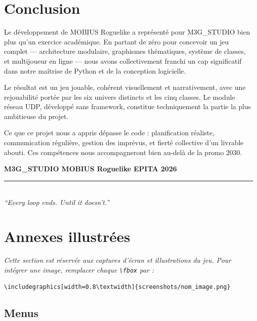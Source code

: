 \documentclass[12pt,a4paper]{article}
\begin{document}
\section{Conclusion}

Le développement de MOBIUS Roguelike a représenté pour M3G\_STUDIO bien plus qu'un exercice académique. En partant de zéro pour concevoir un jeu complet --- architecture modulaire, graphismes thématiques, système de classes, et multijoueur en ligne --- nous avons collectivement franchi un cap significatif dans notre maîtrise de Python et de la conception logicielle.

Le résultat est un jeu jouable, cohérent visuellement et narrativement, avec une rejouabilité portée par les six univers distincts et les cinq classes. Le module réseau UDP, développé sans framework, constitue techniquement la partie la plus ambitieuse du projet.

Ce que ce projet nous a appris dépasse le code : planification réaliste, communication régulière, gestion des imprévus, et fierté collective d'un livrable abouti. Ces compétences nous accompagneront bien au-delà de la promo 2030.

\vspace{1.5cm}
\begin{center}
  {\large\bfseries M3G\_STUDIO \textemdash{} MOBIUS Roguelike \textemdash{} EPITA 2026}\\[8pt]
  {\color{gray}\rule{8cm}{0.4pt}}\\[6pt]
  \textit{``Every loop ends. Until it doesn't.''}
\end{center}

\newpage
\appendix
\renewcommand{\thesection}{\Alph{section}}

\section{Annexes illustrées}

\textit{Cette section est réservée aux captures d'écran et illustrations du jeu. Pour intégrer une image, remplacer chaque \texttt{\textbackslash fbox} par :}
\begin{center}
\texttt{\textbackslash includegraphics[width=0.8\textbackslash textwidth]\{screenshots/nom\_image.png\}}
\end{center}

\subsection{Menus}
\end{document}
